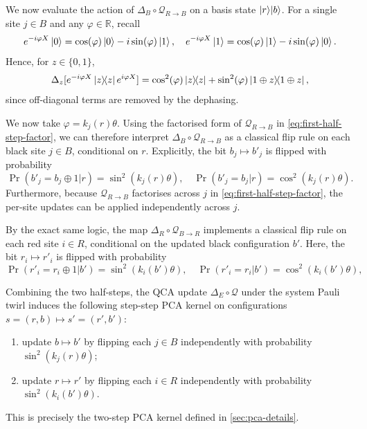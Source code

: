 We now evaluate the action of \(\Delta_B \circ \mathcal{Q}_{R \to B}\) on a basis state \(\ket{r}\!\ket{b}\). For a single site \(j \in B\) and any \(\varphi \in \mathbb{R}\), recall
\begin{equation}
    e^{-i\varphi X} \ket{0} = \cos(\varphi) \ket{0} - i \sin(\varphi) \ket{1}, \quad
    e^{-i\varphi X} \ket{1} = \cos(\varphi) \ket{1} - i \sin(\varphi) \ket{0}.
\end{equation}
Hence, for \(z \in \{0,1\}\),
\begin{equation}
    \Delta_z[e^{-i\varphi X} \ket{z}\!\!\bra{z} e^{i\varphi X}] = \cos^2(\varphi) \ket{z}\!\!\bra{z} + \sin^2(\varphi) \ket{1\oplus z}\!\!\bra{1\oplus z},
\end{equation}
since off-diagonal terms are removed by the dephasing.

We now take \(\varphi = k_j(r) \theta\). Using the factorised form of \(\mathcal{Q}_{R \to B}\) in \cref{eq:first-half-step-factor}, we can therefore interpret \(\Delta_B \circ \mathcal{Q}_{R \to B}\) as a classical flip rule on each black site \(j\in B\), conditional on \(r\). Explicitly, the bit \(b_j \mapsto b'_j\) is flipped with probability
\begin{equation}
    \Pr(b'_j = b_j \oplus 1 | r) = \sin^2(k_j(r) \theta), \quad
    \Pr(b'_j = b_j | r) = \cos^2(k_j(r) \theta).
\end{equation}
Furthermore, because \(\mathcal{Q}_{R \to B}\) factorises across \(j\) in \cref{eq:first-half-step-factor}, the per-site updates can be applied independently across \(j\).

By the exact same logic, the map \(\Delta_R \circ \mathcal{Q}_{B \to R}\) implements a classical flip rule on each red site \(i \in R\), conditional on the updated black configuration \(b'\). Here, the bit \(r_i \mapsto r'_i\) is flipped with probability
\begin{equation}
    \Pr(r'_i = r_i \oplus 1 | b') = \sin^2(k_i(b') \theta), \quad
    \Pr(r'_i = r_i | b') = \cos^2(k_i(b') \theta),
\end{equation}

Combining the two half-steps, the QCA update \(\Delta_E \circ \mathcal{Q}\) under the system Pauli twirl induces the following step-step PCA kernel on configurations \(s = (r,b) \mapsto s'= (r',b')\):
\begin{enumerate}
    \item update \(b \mapsto b'\) by flipping each \(j \in B\) independently with probability \(\sin^2(k_j(r) \theta)\);
    \item update \(r \mapsto r'\) by flipping each \(i \in R\) independently with probability \(\sin^2(k_i(b') \theta)\).
\end{enumerate}
This is precisely the two-step PCA kernel defined in \cref{sec:pca-details}.

